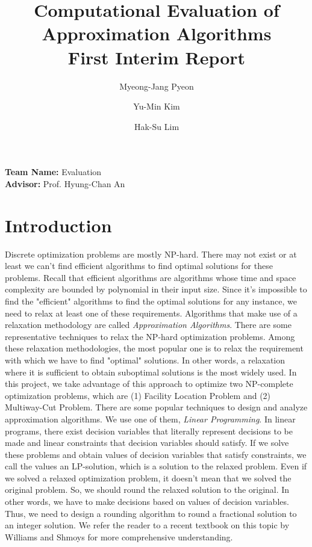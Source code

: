 \documentclass[a4paper]{article}
\title{Computational Evaluation of Approximation Algorithms \\ \Large First Interim Report}
\author{Myeong-Jang Pyeon\and Yu-Min Kim\and Hak-Su Lim}
\begin{document}
\maketitle
\begin{center}
{
\large 
\textbf{Team Name:} Evaluation \\
\textbf{Advisor:} Prof. Hyung-Chan An \\
\par
}
\end{center}

\section{Introduction}
Discrete optimization problems are mostly NP-hard. There may not exist or at least we can't find efficient algorithms to find optimal solutions for these problems. Recall that efficient algorithms are algorithms whose time and space complexity are bounded by polynomial in their input size. Since it's impossible to find the "efficient" algorithms to find the optimal solutions for any instance, we need to relax at least one of these requirements. Algorithms that make use of a relaxation methodology are called \textit{Approximation Algorithms}. 
\newline
\indent
There are some representative techniques to relax the NP-hard optimization problems. Among these relaxation methodologies, the most popular one is to relax the requirement with which we have to find "optimal" solutions. In other words, a relaxation where it is sufficient to obtain suboptimal solutions is the most widely used. In this project, we take advantage of this approach to optimize two NP-complete optimization problems, which are (1) Facility Location Problem and (2) Multiway-Cut Problem.
\newline
\indent
There are some popular techniques to design and analyze approximation algorithms. We use one of them, \textit{Linear Programming}. In linear programs, there exist decision variables that literally represent decisions to be made and linear constraints that decision variables should satisfy. If we solve these problems and obtain values of decision variables that satisfy constraints, we call the values an LP-solution, which is a solution to the relaxed problem.
\newline
\indent
Even if we solved a relaxed optimization problem, it doesn't mean that we solved the original problem. So, we should round the relaxed solution to the original. In other words, we have to make decisions based on values of decision variables. Thus, we need to design a rounding algorithm to round a fractional solution to an integer solution. We refer the reader to a recent textbook on this topic by Williams and Shmoys\cite{williamson2011design} for more comprehensive understanding.
\end{document}
